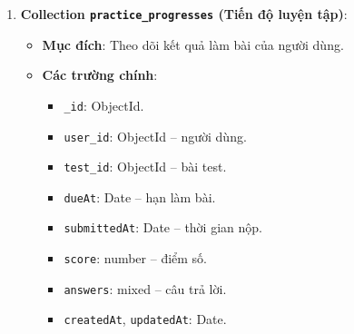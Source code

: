 \begin{enumerate}
\begin{itemize}
\begin{itemize}
            \item \texttt{lesson\_id}: ObjectId | null.
    
            \item \texttt{lessonId}: string.
    
            \item \texttt{chapterId}: string.
    
            \item \texttt{createdAt}, \texttt{updatedAt}: Date.
        \end{itemize}
    \end{itemize}
    
    
    \item \textbf{Collection \texttt{practice\_progresses} (Tiến độ luyện tập)}:
    \begin{itemize}
        \item \textbf{Mục đích}: Theo dõi kết quả làm bài của người dùng.
    
        \item \textbf{Các trường chính}:
        \begin{itemize}
            \item \texttt{\_id}: ObjectId.
    
            \item \texttt{user\_id}: ObjectId – người dùng.
    
            \item \texttt{test\_id}: ObjectId – bài test.
    
            \item \texttt{dueAt}: Date – hạn làm bài.
    
            \item \texttt{submittedAt}: Date – thời gian nộp.
    
            \item \texttt{score}: number – điểm số.
    
            \item \texttt{answers}: mixed – câu trả lời.
    
            \item \texttt{createdAt}, \texttt{updatedAt}: Date.
        \end{itemize}
    \end{itemize}
    
    

\end{enumerate}

